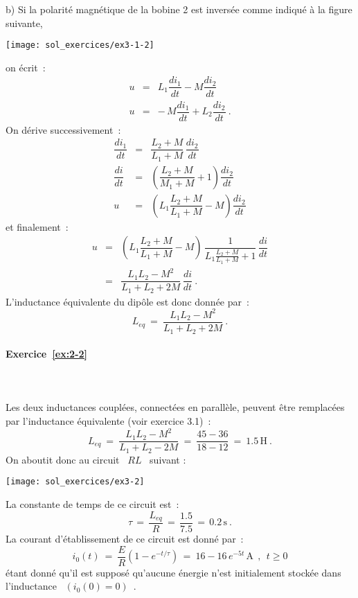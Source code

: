 b) Si la polarité magnétique de la bobine 2 est inversée comme
indiqué à la figure suivante,
\begin{center}
	\texttt{[image: sol\_exercices/ex3-1-2]}
\end{center}
on écrit~: 
\begin{eqnarray*}
	u &=& L_1 \dfrac{di_1}{dt} - M \dfrac{di_2}{dt}\\
	u &=& -\, M  \dfrac{di_1}{dt} + L_2  \dfrac{di_2}{dt}~.
\end{eqnarray*}
On dérive successivement~:
\begin{eqnarray*}
	\dfrac{di_1}{dt} &=& \dfrac{L_2+M}{L_1+M} \, \dfrac{di_2}{dt}\\
	\dfrac{di}{dt} &=& \left( \dfrac{L_2+M}{M_1+M} + 1 \right) \dfrac{di_2}{dt}\\
	u &=& \left( L_1 \dfrac{L_2+M}{L_1+M} - M \right) \dfrac{di_2}{dt}
\end{eqnarray*}
et finalement~:
\begin{eqnarray*}
	u &=& \left( L_1 \dfrac{L_2+M}{L_1+M} - M \right)   \, \dfrac{1}{L_1 \frac{L_2+M}{L_1+M} + 1} 
	\,  \dfrac{di}{dt}\\
	&=& \dfrac{L_1L_2 - M^2}{L_1 + L_2 + 2M} \,  \dfrac{di}{dt}~.
\end{eqnarray*}
L'inductance équivalente du dipôle est donc donnée par~:
\[ L_{eq} \: = \: \dfrac{L_1L_2 - M^2}{L_1 + L_2 + 2M}~. \]


\paragraph{Exercice~\ref{ex:2-2}}~\\%

\\
Les deux inductances couplées, connectées en parallèle, peuvent être
remplacées par l'inductance équivalente (voir exercice 3.1)~:
\[ L_{eq} \: = \: \dfrac{L_1L_2 - M^2}{L_1+L_2 -2M} 
\: = \: \dfrac{45-36}{18-12} \: = \: 1.5 \, \mbox{H}~. \]
On aboutit donc au circuit \ $RL$ \ suivant : 
\begin{center}
	\texttt{[image: sol\_exercices/ex3-2]}
\end{center}
La constante de temps de ce circuit est~:
\[ \tau \, = \, \dfrac{L_{eq}}{R} \, = \, \dfrac{1.5}{7.5} \, = \, 0.2\, \mbox{s}~. \]
La courant d'établissement de ce circuit est donné par~:
\[ i_0(t) \: = \: \dfrac{E}{R} \left( 1 - e^{-t/\tau}\right) \, = \: 16-16\, e^{-5t}
\, \mbox{A}~~,~~t\geq 0\]
étant donné qu'il est supposé qu'aucune énergie n'est initialement stockée dans l'inductance 
\ $(i_0(0) = 0)$~.


